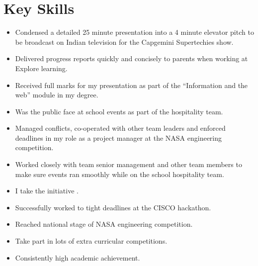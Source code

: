 \documentclass[11pt,a4paper,sans]{moderncv} %
\begin{document}


\section{Key Skills}

{\begin{itemize}
	\item Condensed a detailed 25 minute presentation into a 4 minute elevator pitch to be broadcast on Indian television for the Capgemini Supertechies show.
	\item Delivered progress reports quickly and concisely to parents when working at Explore learning.
	\item Received full marks for my presentation as part of the ``Information and the web'' module in my degree.
	\item Was the public face at school events as part of the hospitality team.
\end{itemize}	
}

{\begin{itemize}
	\item Managed conflicts, co-operated with other team leaders and enforced deadlines in my role as a project manager at the NASA engineering competition.
	\item Worked closely with team senior management and other team members to make sure events ran smoothly while on the school hospitality team.
\end{itemize}
}

{
\begin{itemize}
	\item I take the initiative .
	\item Successfully worked to tight deadlines at the CISCO hackathon.
	\item Reached national stage of NASA engineering competition.
	\item Take part in lots of extra curricular competitions.
	\item Consistently high academic achievement.
\end{itemize}
}
\end{document}
